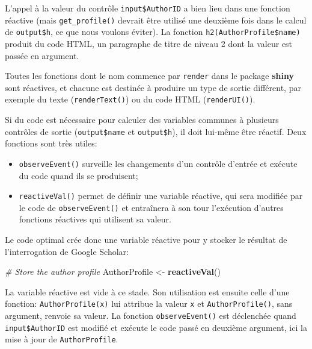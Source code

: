 \documentclass[
  12pt,
  french,
  a4paper,
  extrafontsizes,onecolumn,openright
  ]{memoir}
\newenvironment{Shaded}{\begin{snugshade}}{\end{snugshade}}
\newcommand{\CommentTok}[1]{\textcolor[rgb]{0.56,0.35,0.01}{\textit{#1}}}
\newcommand{\FunctionTok}[1]{\textcolor[rgb]{0.13,0.29,0.53}{\textbf{#1}}}
\newcommand{\NormalTok}[1]{#1}
\newcommand{\OtherTok}[1]{\textcolor[rgb]{0.56,0.35,0.01}{#1}}
\providecommand{\tightlist}{%
  \setlength{\itemsep}{0pt}\setlength{\parskip}{0pt}}
\begin{document}
\normalsize

L'appel à la valeur du contrôle \texttt{input\$AuthorID} a bien lieu dans une fonction réactive (mais \texttt{get\_profile()} devrait être utilisé une deuxième fois dans le calcul de \texttt{output\$h}, ce que nous voulons éviter).
La fonction \texttt{h2(AuthorProfile\$name)} produit du code HTML, un paragraphe de titre de niveau 2 dont la valeur est passée en argument.

Toutes les fonctions dont le nom commence par \texttt{render} dans le package \textbf{shiny} sont réactives, et chacune est destinée à produire un type de sortie différent, par exemple du texte (\texttt{renderText()}) ou du code HTML (\texttt{renderUI()}).

Si du code est nécessaire pour calculer des variables communes à plusieurs contrôles de sortie (\texttt{output\$name} et \texttt{output\$h}), il doit lui-même être réactif.
Deux fonctions sont très utiles:

\begin{itemize}
\tightlist
\item
  \texttt{observeEvent()} surveille les changements d'un contrôle d'entrée et exécute du code quand ils se produisent;
\item
  \texttt{reactiveVal()} permet de définir une variable réactive, qui sera modifiée par le code de \texttt{observeEvent()} et entraînera à son tour l'exécution d'autres fonctions réactives qui utilisent sa valeur.
\end{itemize}

Le code optimal crée donc une variable réactive pour y stocker le résultat de l'interrogation de Google Scholar:

\scriptsize

\begin{Shaded}
\begin{Highlighting}[]
  \CommentTok{\# Store the author profile}
\NormalTok{  AuthorProfile }\OtherTok{\textless{}{-}} \FunctionTok{reactiveVal}\NormalTok{()}
\end{Highlighting}
\end{Shaded}

\normalsize

La variable réactive est vide à ce stade.
Son utilisation est ensuite celle d'une fonction: \texttt{AuthorProfile(x)} lui attribue la valeur \texttt{x} et \texttt{AuthorProfile()}, sans argument, renvoie sa valeur.
La fonction \texttt{observeEvent()} est déclenchée quand \texttt{input\$AuthorID} est modifié et exécute le code passé en deuxième argument, ici la mise à jour de \texttt{AuthorProfile}.
\end{document}
